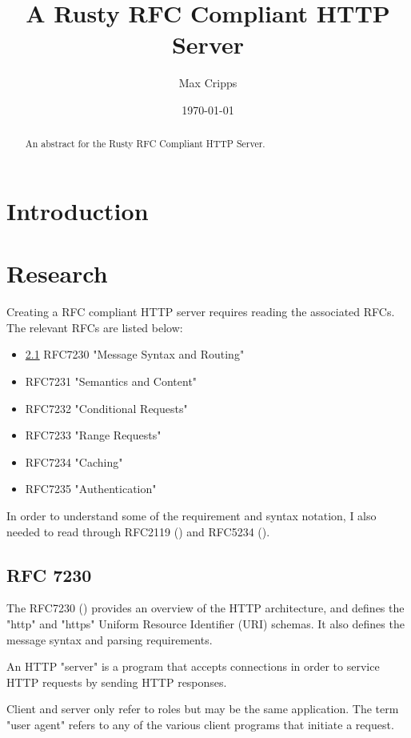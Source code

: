 \documentclass[12pt, a4paper]{article}
\title{A Rusty RFC Compliant HTTP Server}
\author{Max Cripps}
\date{\today}
\begin{document}
\maketitle 

\begin{abstract}
An abstract for the Rusty RFC Compliant HTTP Server.
\end{abstract}

\section{Introduction}


\section{Research}

Creating a RFC compliant HTTP server requires reading the associated RFCs. The relevant RFCs are listed
below:
\begin{itemize}
    \item \ref{sec:rfc7230} RFC7230 "Message Syntax and Routing"
    \item RFC7231 "Semantics and Content"
    \item RFC7232 "Conditional Requests"
    \item RFC7233 "Range Requests"
    \item RFC7234 "Caching"
    \item RFC7235 "Authentication"
\end{itemize}

In order to understand some of the requirement and syntax notation, I also needed to read through
RFC2119 (\cite{rfc2119}) and RFC5234 (\cite{rfc5234}).

\subsection{RFC 7230}
\label{sec:rfc7230}

The RFC7230 (\cite{rfc7230}) provides an overview of the HTTP architecture, and defines the "http"
and "https" Uniform Resource Identifier (URI) schemas. It also defines the message syntax and parsing
requirements.

An HTTP "server" is a program that accepts connections in order to service HTTP requests by sending
HTTP responses.

Client and server only refer to roles but may be the same application. The term "user agent" refers
to any of the various client programs that initiate a request.
\end{document}
